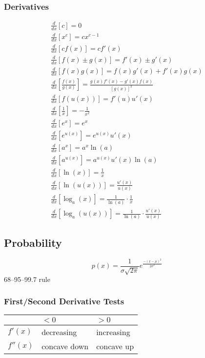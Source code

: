 \documentclass[letterpaper,12pt,fleqn]{article}
\newcommand{\m}{\mu}
\renewcommand{\o}{\sigma}
\begin{document}
\subsubsection*{Derivatives}

\begin{gather*}
  \frac{d}{dx}\left[c\right]=0 \\
  \frac{d}{dx}\left[x^c\right]=cx^{c-1} \\
  \frac{d}{dx}\left[cf(x)\right]=cf'(x) \\
  \frac{d}{dx}\left[f(x)\pm g(x)\right]=f'(x)\pm g'(x) \\
  \frac{d}{dx}\left[f(x)g(x)\right]=f(x)g'(x)+f'(x)g(x) \\
  \frac{d}{dx}\left[\frac{f(x)}{g(x)}\right]=\frac{g(x)f'(x)-g'(x)f(x)}{[g(x)]^2} \\
  \frac{d}{dx}\left[f(u(x))\right]=f'(u)u'(x) \\
  \frac{d}{dx}\left[\frac{1}{x}\right]=-\frac{1}{x^2} \\
  \frac{d}{dx}\left[e^x\right]=e^x \\
  \frac{d}{dx}\left[e^{u(x)}\right]=e^{u(x)}u'(x) \\
  \frac{d}{dx}\left[a^x\right]=a^x\ln(a) \\
  \frac{d}{dx}\left[a^{u(x)}\right]=a^{u(x)}u'(x)\ln(a) \\
  \frac{d}{dx}\left[\ln(x)\right]=\frac{1}{x} \\
  \frac{d}{dx}\left[\ln(u(x))\right]=\frac{u'(x)}{u(x)} \\
  \frac{d}{dx}\left[\log_a(x)\right]=\frac{1}{\ln(a)}\cdot\frac{1}{x} \\
  \frac{d}{dx}\left[\log_a(u(x))\right]=\frac{1}{\ln(a)}\cdot\frac{u'(x)}{u(x)}
\end{gather*}

\subsection*{Probability}

\[p(x)=\frac{1}{\o\sqrt{2\pi}}e^{\frac{-(x-\m)^2}{2\o^2}}\]
68--95--99.7 rule

\subsubsection*{First/Second Derivative Tests}

\begin{tabular}{|l|l|l|}
  \hline
  & \(<0\) & \(>0\) \\
  \hline
  \(f'(x)\) & decreasing & increasing \\
  \hline
  \(f''(x)\) & concave down & concave up \\
  \hline
\end{tabular}
\end{document}
